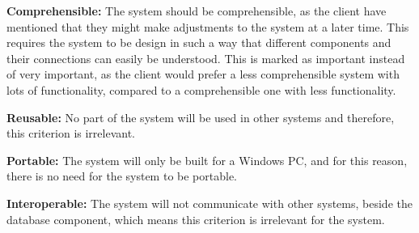 \textbf{Comprehensible:} The system should be comprehensible, as the client have mentioned that they might make adjustments to the system at a later time. This requires the system to be design in such a way that different components and their connections can easily be understood. This is marked as important instead of very important, as the client would prefer a less comprehensible system with lots of functionality, compared to a comprehensible one with less functionality.

\textbf{Reusable:} No part of the system will be used in other systems and therefore, this criterion is irrelevant.

\textbf{Portable:} The system will only be built for a Windows PC, and for this reason, there is no need for the system to be portable. 

\textbf{Interoperable:} The system will not communicate with other systems, beside the database component, which means this criterion is irrelevant for the system.
\newpage